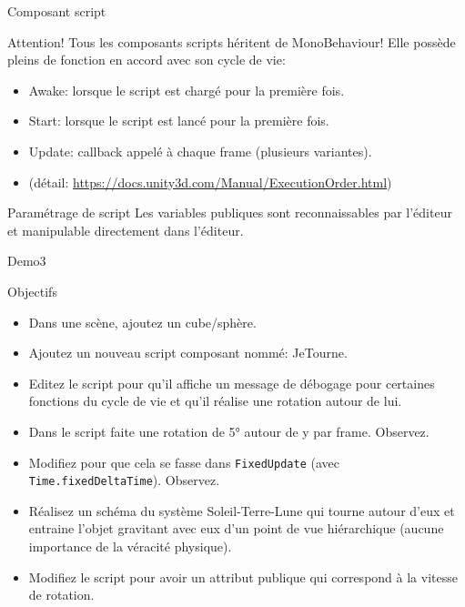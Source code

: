 \begin{frame}[fragile]{Composant script}
	\vfill
	\begin{alertblock}{Attention!}
		Tous les composants scripts héritent de MonoBehaviour! Elle possède pleins de fonction en accord avec son cycle de vie:
		\begin{itemize}
			\item Awake: lorsque le script est chargé pour la première fois.
			\item Start: lorsque le script est lancé pour la première fois.
			\item Update: callback appelé à chaque frame (plusieurs variantes). 
			\item (détail: \url{https://docs.unity3d.com/Manual/ExecutionOrder.html})
		\end{itemize}
	\end{alertblock}

	\vfill
	\begin{block}{Paramétrage de script}
		Les variables publiques sont reconnaissables par l'éditeur et manipulable directement dans l'éditeur. 
	\end{block}
	\vfill
\end{frame}


\begin{frame}{Demo3}
		\vfill
	\begin{block}{Objectifs}
		\begin{itemize}
			\item Dans une scène, ajoutez un cube/sphère.
			\item Ajoutez un nouveau script composant nommé: JeTourne.
			\item Editez le script pour qu'il affiche un message de débogage pour certaines fonctions du cycle de vie et qu'il réalise une rotation autour de lui.
			\item Dans le script faite une rotation de 5° autour de y par frame. Observez.
			\item Modifiez pour que cela se fasse dans \texttt{FixedUpdate} (avec \texttt{Time.fixedDeltaTime}). Observez.
			\item Réalisez un schéma du système Soleil-Terre-Lune qui tourne autour d'eux et entraine l'objet gravitant avec eux d'un point de vue hiérarchique (aucune importance de la véracité physique).
			\item Modifiez le script pour avoir un attribut publique qui correspond à la vitesse de rotation.
		\end{itemize}
	\end{block}
		\vfill
	
\end{frame}



